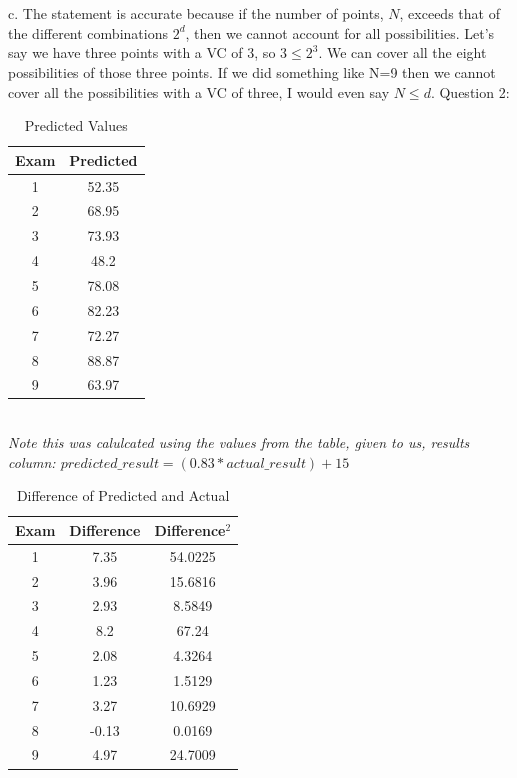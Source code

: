 \documentclass[12pt]{article}
\begin{document}
\\\\\indent c. The statement is accurate because if the number of points, $N$, exceeds that of the different 
combinations $2^d$, then we cannot account for all possibilities.
 Let's say we have three points with a VC of 3, so $3 \leq 2^3$. 
We can cover all the eight possibilities of those three points. 
If we did something like N=9 then we cannot cover all the possibilities with a VC of three, I would even say $N \leq d$.
\newpage
\vspace*{-1cm}
\noindent Question 2:
\begin{table}[h]
    \centering
    \begin{tabular}{|c|c|}
    \hline
    Exam & Predicted \\
    \hline
    1 & 52.35 \\
    2 & 68.95 \\
    3 & 73.93 \\
    4 & 48.2 \\
    5 & 78.08 \\
    6 & 82.23 \\
    7 & 72.27 \\
    8 & 88.87 \\
    9 & 63.97 \\
    \hline
    \end{tabular}
    \caption{Predicted Values}
\end{table}
\\\indent\textit{Note this was calulcated using the values from the table, given to us, results column: $predicted\_result = (0.83 * actual\_result)+15$}
\begin{table}[h]
    \centering
    \begin{tabular}{|c|c|c|}
    \hline
    Exam & Difference & Difference$^2$ \\
    \hline
    1 & 7.35 & 54.0225 \\
    2 & 3.96 & 15.6816 \\
    3 & 2.93 & 8.5849 \\
    4 & 8.2 & 67.24\\
    5 & 2.08 & 4.3264 \\
    6 & 1.23 & 1.5129 \\
    7 & 3.27 & 10.6929 \\
    8 & -0.13 & 0.0169 \\
    9 & 4.97 & 24.7009 \\
    \hline
    \end{tabular}
    \caption{Difference of Predicted and Actual}
\end{table}
\end{document}

